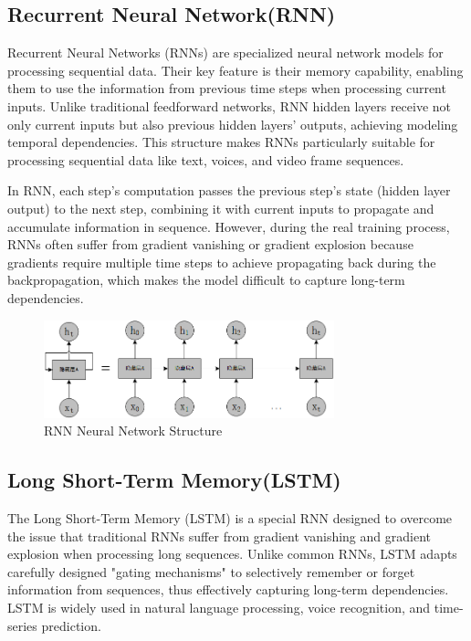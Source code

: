 \subsection{Recurrent Neural Network(RNN)}

Recurrent Neural Networks (RNNs) are specialized neural network models for processing sequential data. Their key feature is their memory capability, enabling them to use the information from previous time steps when processing current inputs. Unlike traditional feedforward networks, RNN hidden layers receive not only current inputs but also previous hidden layers’ outputs, achieving modeling temporal dependencies. This structure makes RNNs particularly suitable for processing sequential data like text, voices, and video frame sequences.

In RNN, each step's computation passes the previous step's state (hidden layer output) to the next step, combining it with current inputs to propagate and accumulate information in sequence. However, during the real training process, RNNs often suffer from gradient vanishing or gradient explosion because gradients require multiple time steps to achieve propagating back during the backpropagation, which makes the model difficult to capture long-term dependencies.

\begin{figure}[hbt]
	\centering
	\includegraphics[width=0.75\textwidth]{figures/2.4}
	\caption{RNN Neural Network Structure}\label{fig:2.4}
\end{figure}

\subsection{Long Short-Term Memory(LSTM)}

The Long Short-Term Memory (LSTM) \cite{graves2012long} is a special RNN designed to overcome the issue that traditional RNNs suffer from gradient vanishing and gradient explosion when processing long sequences. Unlike common RNNs, LSTM adapts carefully designed "gating mechanisms" to selectively remember or forget information from sequences, thus effectively capturing long-term dependencies. LSTM is widely used in natural language processing, voice recognition, and time-series prediction.

